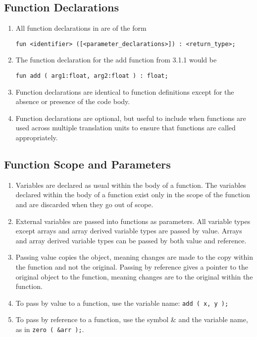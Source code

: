 \subsection{Function Declarations}\label{ssec:Function Declarations}
\begin{enumerate}
	\item All function declarations in \lepix{} are of the form
\begin{lstlisting}[numbers=none]
fun <identifier> ([<parameter_declarations>]) : <return_type>;
\end{lstlisting}
	\item The function declaration for the add function from 3.1.1 would be
\begin{lstlisting}[numbers=none]
fun add ( arg1:float, arg2:float ) : float;
\end{lstlisting}
	\item Function declarations are identical to function definitions except for the absence or presence of the code body.
	\item Function declarations are optional, but useful to include when functions are used across multiple translation units to ensure that functions are called appropriately.
\end{enumerate}

\subsection{Function Scope and Parameters}\label{ssec: Function Scope and Parameters}
\begin{enumerate}
	\item Variables are declared as usual within the body of a function. The variables declared within the body of a function exist only in the scope of the function and are discarded when they go out of scope.
	\item External variables are passed into functions as parameters. All variable types except arrays and array derived variable types are passed by value. Arrays and array derived variable types can be passed by both value and reference.
	\item Passing value copies the object, meaning changes are made to the copy within the function and not the original. Passing by reference gives a pointer to the original object to the function, meaning changes are to the original within the function.
	\item To pass by value to a function, use the variable name: \lstinline|add ( x, y );|
	\item To pass by reference to a function, use the symbol \& and the variable name, as in \lstinline|zero ( &arr );|.	
\end{enumerate}
